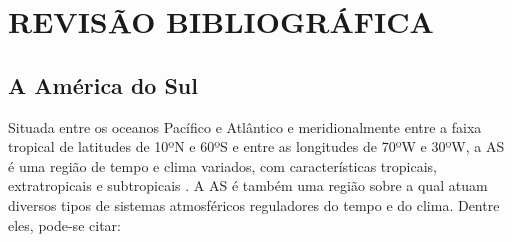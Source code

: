 \hypertarget{estilo:capitulo}{}
\chapter{REVISÃO BIBLIOGRÁFICA}

\section{A América do Sul}
\label{ss:americadosul}

Situada entre os oceanos Pacífico e Atlântico e meridionalmente entre a faixa tropical de latitudes de 10ºN e 60ºS e entre as longitudes de 70ºW e 30ºW, a AS é uma região de tempo e clima variados, com características tropicais, extratropicais e subtropicais \cite{satyamurtyetal98}. A AS é também uma região sobre a qual atuam diversos tipos de sistemas atmosféricos reguladores do tempo e do clima. Dentre eles, pode-se citar: 


